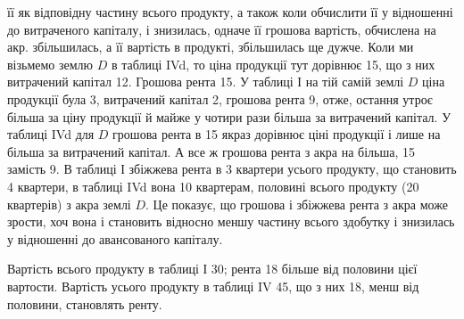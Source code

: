 її як відповідну частину всього продукту, а також коли обчислити її у відношенні
до витраченого капіталу, і знизилась, одначе її грошова вартість,
обчислена на акр. збільшилась, а її вартість в продукті, збільшилась ще дужче.
Коли ми візьмемо землю $D$ в таблиці IVd, то ціна продукції тут дорівнює
15, що з них витрачений капітал \deq{} 12. Грошова рента \deq{} 15. У таблиці І на тій самій землі $D$ ціна продукції була 3, витрачений
капітал \deq{} 2, грошова рента \deq{} 9, отже, остання
утроє більша за ціну продукції й майже у чотири рази більша за витрачений
капітал. У таблиці IVd для $D$ грошова рента в 15 якраз дорівнює ціні
продукції і лише на   більша за витрачений капітал. А все ж грошова рента
з акра на   більша, 15 замість 9. В таблиці І збіжжева
рента в 3 квартери \deq{}   усього продукту, що становить 4 квартери, в таблиці
IVd вона \deq{} 10 квартерам, половині всього продукту (20 квартерів) з акра
землі $D$. Це показує, що грошова і збіжжева рента з акра може зрости, хоч
вона і становить відносно меншу частину всього здобутку і знизилась у відношенні
до авансованого капіталу.

Вартість всього продукту в таблиці І \deq{} 30; рента \deq{} 18 більше від половини цієї вартости. Вартість усього продукту в таблиці
IV \deq{} 45, що з них 18, менш від половини, становлять
ренту.
